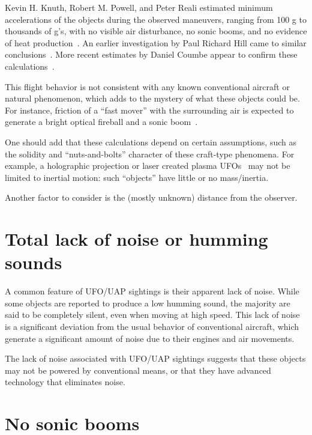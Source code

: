 Kevin H. Knuth, Robert M. Powell, and Peter Reali estimated minimum accelerations of the objects during the observed maneuvers, ranging from 100 g to thousands of g's, with no visible air disturbance, no sonic booms, and no evidence of heat production~\cite{Knuth-e21100939,NimitzSCURep2019Mar}. An earlier investigation by Paul Richard Hill came to similar conclusions~\cite[pp.~48,49]{Hill2014Jun}.
More recent estimates by Daniel Coumbe appear to confirm these calculations~\cite{Coumbe2022Oct}.

This flight behavior is not consistent with any known conventional aircraft or natural phenomenon,
which adds to the mystery of what these objects could be.
For instance,  friction of a ``fast mover'' with the surrounding air is expected to generate a bright
optical fireball and a sonic boom~\cite{Loeb2022Oct,Loeb2023Mar}.

One should add that these calculations depend on certain assumptions, such as the solidity and ``nuts-and-bolts''
character of these craft-type phenomena.
For example, a holographic projection
or laser created plasma UFOs~\cite{Hambling2020May,Mizokami2020May} may not be limited to inertial motion:
such ``objects'' have little or no mass/inertia.

Another factor to consider is the (mostly unknown) distance from the observer.


\section{Total lack of noise or humming sounds}
\label{2023-UFO-part-Perception-flight-characteristics-lnhs}

A common feature of UFO/UAP sightings is their apparent lack of noise. While some objects are reported to produce a low humming sound, the majority are said to be completely silent, even when moving at high speed. This lack of noise is a significant deviation from the usual behavior of conventional aircraft, which generate a significant amount of noise due to their engines and air movements.

The lack of noise associated with UFO/UAP sightings suggests that these objects may not be powered by conventional means, or that they have advanced technology that eliminates noise.

\section{No sonic booms}

